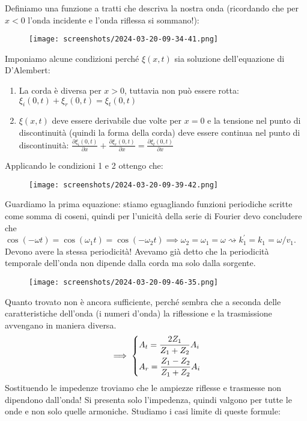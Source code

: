Definiamo una funzione a tratti che descriva la nostra onda (ricordando che per \(x <0\) l'onda incidente e l'onda riflessa si sommano!):
\begin{figure}[H]
	\centering
	\texttt{[image: screenshots/2024-03-20-09-34-41.png]}
\end{figure}
Imponiamo alcune condizioni perché \(\xi (x,t)\) sia soluzione dell'equazione di D'Alembert:
\begin{enumerate}
	\item La corda è diversa per \(x>0\), tuttavia non può essere rotta: \(\xi_i(0,t) + \xi _r (0,t) = \xi _t (0,t)\)
	\item \(\xi (x,t)\) deve essere derivabile due volte per \(x=0\) e la tensione nel punto di discontinuità (quindi la forma della corda) deve essere continua nel punto di discontinuità: \(\frac{\partial \xi _i (0,t)}{\partial x} + \frac{\partial \xi _r ( 0,t)}{\partial x} = \frac{\partial \xi _t (0,t)}{\partial x}  \)    
\end{enumerate}
Applicando le condizioni 1 e 2 ottengo che:
\begin{figure}[H]
	\centering
	\texttt{[image: screenshots/2024-03-20-09-39-42.png]}
\end{figure}
Guardiamo la prima equazione: stiamo eguagliando funzioni periodiche scritte come somma di coseni, quindi per l'unicità della serie di Fourier devo concludere che \(\cos (-\omega t) = \cos (\omega _1 t) = \cos (-\omega _2 t) \implies \omega _2 = \omega _1 = \omega \rightsquigarrow k_1^{\prime} =k_1 = \omega /v_1\). Devono avere la stessa periodicità! Avevamo già detto che la periodicità temporale dell'onda non dipende dalla corda ma solo dalla sorgente.
\begin{figure}[H]
	\centering
	\texttt{[image: screenshots/2024-03-20-09-46-35.png]}
\end{figure}
Quanto trovato non è ancora sufficiente, perché sembra che a seconda delle caratteristiche dell'onda (i numeri d'onda) la riflessione e la trasmissione avvengano in maniera diversa.
\[
	\implies \begin{dcases}
		A_t = \frac{2Z_1}{Z_1 + Z_2}A_i\\
		A_r = \frac{Z_1 - Z_2}{Z_1 + Z_2}A_i\\
	\end{dcases}
\]
Sostituendo le impedenze troviamo che le ampiezze riflesse e trasmesse non dipendono dall'onda! Si presenta solo l'impedenza, quindi valgono per tutte le onde e non solo quelle armoniche. Studiamo i casi limite di queste formule:
